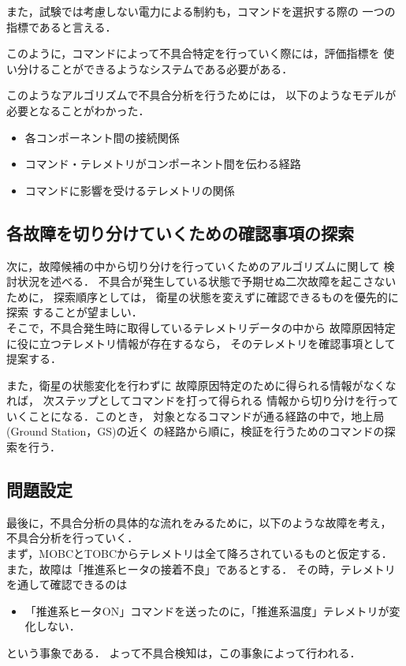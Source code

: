 \documentclass[11pt]{article}
\begin{document}
また，試験では考慮しない電力による制約も，コマンドを選択する際の
一つの指標であると言える．

このように，コマンドによって不具合特定を行っていく際には，評価指標を
使い分けることができるようなシステムである必要がある．

このようなアルゴリズムで不具合分析を行うためには，
以下のようなモデルが必要となることがわかった．
\begin{itemize}
   \item 各コンポーネント間の接続関係
   \item コマンド・テレメトリがコンポーネント間を伝わる経路
   \item コマンドに影響を受けるテレメトリの関係
\end{itemize}



\subsection{各故障を切り分けていくための確認事項の探索}
次に，故障候補の中から切り分けを行っていくためのアルゴリズムに関して
検討状況を述べる．
不具合が発生している状態で予期せぬ二次故障を起こさないために，
探索順序としては，
衛星の状態を変えずに確認できるものを優先的に探索
することが望ましい．\\ %
そこで，不具合発生時に取得しているテレメトリデータの中から
故障原因特定に役に立つテレメトリ情報が存在するなら，
そのテレメトリを確認事項として提案する．

また，衛星の状態変化を行わずに
故障原因特定のために得られる情報がなくなれば，
次ステップとしてコマンドを打って得られる
情報から切り分けを行っていくことになる．このとき，
対象となるコマンドが通る経路の中で，地上局(Ground Station，GS)の近く
の経路から順に，検証を行うためのコマンドの探索を行う．

\subsection{問題設定}
最後に，不具合分析の具体的な流れをみるために，以下のような故障を考え，
不具合分析を行っていく．\\
まず，MOBCとTOBCからテレメトリは全て降ろされているものと仮定する．
また，故障は「推進系ヒータの接着不良」であるとする．
その時，テレメトリを通して確認できるのは
\begin{itemize}
   \item 「推進系ヒータON」コマンドを送ったのに，「推進系温度」テレメトリが変化しない．
\end{itemize}
という事象である．
よって不具合検知は，この事象によって行われる．
\end{document}
